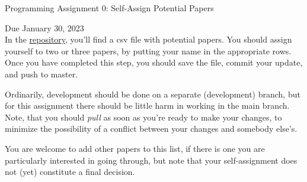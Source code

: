 \documentclass[10pt, a4paper]{article}
\begin{document}


\begin{center}
	\Large Programming Assignment 0: Self-Assign Potential Papers \end{center}
\hspace{5.5in} Due January 30, 2023\\ 

In  the \href{https://github.com/schmidttgenstein/fa23-mlii.git}{repository}, you'll find a csv file with potential papers. You should assign yourself to two or three papers, by putting your name in the appropriate rows. Once you have completed this step, you should save the  file, commit your update, and push to master. 


Ordinarily, development should be done on a separate (development) branch, but for this assignment there should be little harm in working in the main branch. Note, that you should \textit{pull} as soon as you're ready to make your changes, to minimize the possibility of a conflict between your changes and somebody else's. 

You are welcome to add other papers to this list, if there is one you are particularly interested in going through, but note that your self-assignment does not (yet) constitute a final decision.

\noindent 



\end{document}
